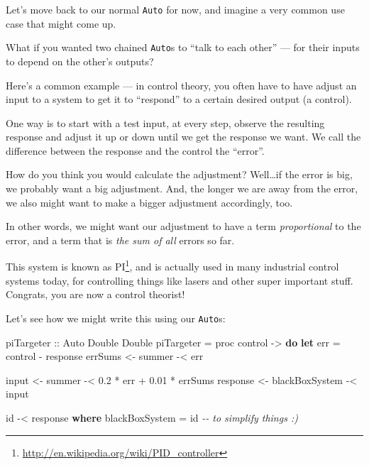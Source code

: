 \documentclass[]{article}
\newenvironment{Shaded}{}{}
\newcommand{\CommentTok}[1]{\textcolor[rgb]{0.38,0.63,0.69}{\textit{#1}}}
\newcommand{\DataTypeTok}[1]{\textcolor[rgb]{0.56,0.13,0.00}{#1}}
\newcommand{\FloatTok}[1]{\textcolor[rgb]{0.25,0.63,0.44}{#1}}
\newcommand{\FunctionTok}[1]{\textcolor[rgb]{0.02,0.16,0.49}{#1}}
\newcommand{\KeywordTok}[1]{\textcolor[rgb]{0.00,0.44,0.13}{\textbf{#1}}}
\newcommand{\NormalTok}[1]{#1}
\newcommand{\OperatorTok}[1]{\textcolor[rgb]{0.40,0.40,0.40}{#1}}
\newcommand{\OtherTok}[1]{\textcolor[rgb]{0.00,0.44,0.13}{#1}}
\renewcommand{\href}[2]{#2\footnote{\url{#1}}}
\begin{document}
Let's move back to our normal \texttt{Auto} for now, and imagine a very common
use case that might come up.

What if you wanted two chained \texttt{Auto}s to ``talk to each other'' --- for
their inputs to depend on the other's outputs?

Here's a common example --- in control theory, you often have to have adjust an
input to a system to get it to ``respond'' to a certain desired output (a
control).

One way is to start with a test input, at every step, observe the resulting
response and adjust it up or down until we get the response we want. We call the
difference between the response and the control the ``error''.

How do you think you would calculate the adjustment? Well\ldots if the error is
big, we probably want a big adjustment. And, the longer we are away from the
error, we also might want to make a bigger adjustment accordingly, too.

In other words, we might want our adjustment to have a term \emph{proportional}
to the error, and a term that is \emph{the sum of all} errors so far.

This system is known as \href{http://en.wikipedia.org/wiki/PID_controller}{PI},
and is actually used in many industrial control systems today, for controlling
things like lasers and other super important stuff. Congrats, you are now a
control theorist!

Let's see how we might write this using our \texttt{Auto}s:

\begin{Shaded}
\begin{Highlighting}[]
\OtherTok{piTargeter ::} \DataTypeTok{Auto} \DataTypeTok{Double} \DataTypeTok{Double}
\NormalTok{piTargeter }\OtherTok{=}\NormalTok{ proc control }\OtherTok{{-}\textgreater{}} \KeywordTok{do}
    \KeywordTok{let}\NormalTok{ err }\OtherTok{=}\NormalTok{ control }\OperatorTok{{-}}\NormalTok{ response}
\NormalTok{    errSums  }\OtherTok{\textless{}{-}}\NormalTok{ summer         }\OperatorTok{{-}\textless{}}\NormalTok{ err}

\NormalTok{    input    }\OtherTok{\textless{}{-}}\NormalTok{ summer         }\OperatorTok{{-}\textless{}} \FloatTok{0.2} \OperatorTok{*}\NormalTok{ err }\OperatorTok{+} \FloatTok{0.01} \OperatorTok{*}\NormalTok{ errSums}
\NormalTok{    response }\OtherTok{\textless{}{-}}\NormalTok{ blackBoxSystem }\OperatorTok{{-}\textless{}}\NormalTok{ input}

    \FunctionTok{id} \OperatorTok{{-}\textless{}}\NormalTok{ response}
  \KeywordTok{where}
\NormalTok{    blackBoxSystem }\OtherTok{=} \FunctionTok{id}     \CommentTok{{-}{-} to simplify things :)}
\end{Highlighting}
\end{Shaded}
\end{document}
